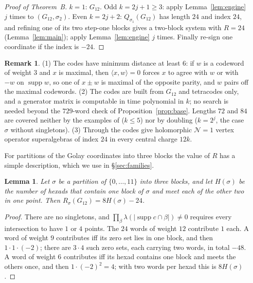 \documentclass[11pt]{amsart}
\newtheorem{lemma}[theorem]{Lemma}
\theoremstyle{definition}
\newtheorem{remark}[theorem]{Remark}
\newcommand{\supp}{\operatorname{supp}}
\begin{document}
\begin{proof}[Proof of Theorem~B]
$k=1$: $G_{12}$. Odd $k=2j+1\ge3$: apply Lemma~\ref{lem:engine} $j$ times to $(G_{12},\sigma_2)$.
Even $k=2j+2$: $Q_{\sigma_1}(G_{12})$ has length $24$ and index $24$, and refining one of its two
step-one blocks gives a two-block system with $R=24$ (Lemma~\ref{lem:main}); apply
Lemma~\ref{lem:engine} $j$ times. Finally re-sign one coordinate if the index is $-24$.
\end{proof}

\begin{remark}\label{rem:existence}
(1) The codes have minimum distance at least $6$: if $w$ is a codeword of weight $3$ and $x$ is
maximal, then $\langle x,w\rangle=0$ forces $x$ to agree with $w$ or with $-w$ on $\supp w$, so one of
$x\pm w$ is maximal of the opposite parity, and $w$ pairs off the maximal codewords. (2) The codes are
built from $G_{12}$ and tetracodes only, and a generator matrix is computable in time polynomial in
$k$; no search is needed beyond the $729$-word check of Proposition~\ref{prop:base}. Lengths $72$ and
$84$ are covered neither by the examples of \cite{GJF} ($k\le5$) nor by doubling ($k=2^j$, the case
$\sigma$ without singletons). (3) Through \cite{GJF} the codes give holomorphic $\mathcal N=1$ vertex
operator superalgebras of index $24$ in every central charge $12k$.
\end{remark}

For partitions of the Golay coordinates into three blocks the value of $R$ has a simple description,
which we use in \S\ref{sec:families}.

\begin{lemma}\label{lem:8H}
Let $\sigma$ be a partition of $\{0,\dots,11\}$ into three blocks, and let $H(\sigma)$ be the number
of hexads that contain one block of $\sigma$ and meet each of the other two in one point. Then
$R_\sigma(G_{12})=8H(\sigma)-24$.
\end{lemma}

\begin{proof}
There are no singletons, and $\prod_\beta\lambda(|\supp c\cap\beta|)\ne0$ requires every intersection
to have $1$ or $4$ points. The $24$ words of weight $12$ contribute $1$ each. A word of weight $9$
contributes iff its zero set lies in one block, and then $1\cdot1\cdot(-2)$; there are $3\cdot4$ such
zero sets, each carrying two words, in total $-48$. A word of weight $6$ contributes iff its hexad
contains one block and meets the others once, and then $1\cdot(-2)^2=4$; with two words per hexad this
is $8H(\sigma)$.
\end{proof}
\end{document}
